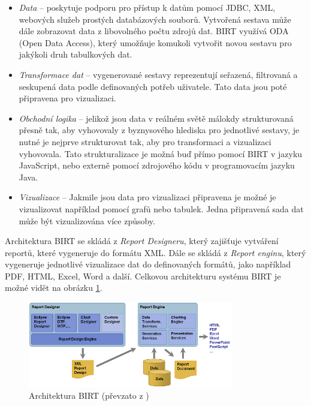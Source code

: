 \documentclass[czech,master]{diploma}
\begin{document}
\begin{itemize}
\item \textit{Data} -- poskytuje podporu pro přístup k datům pomocí JDBC, XML, webových služeb prostých databázových souborů. Vytvořená sestava může dále zobrazovat data z libovolného počtu zdrojů dat. BIRT využívá ODA (Open Data Access), který umožňuje komukoli vytvořit novou sestavu pro jakýkoli druh tabulkových dat.
\item \textit{Transformace dat} -- vygenerované sestavy reprezentují seřazená, filtrovaná a seskupená data podle definovaných potřeb uživatele. Tato data jsou poté připravena pro vizualizaci.
\item \textit{Obchodní logika} -- jelikož jsou data v reálném světě málokdy strukturovaná přesně tak, aby vyhovovaly z byznysového hlediska pro jednotlivé sestavy, je nutné je nejprve strukturovat tak, aby pro transformaci a vizualizaci vyhovovala. Tato strukturalizace je možná buď přímo pomocí BIRT v jazyku JavaScript, nebo externě pomocí zdrojového kódu v programovacím jazyku Java.

\item \textit{Vizualizace} -- Jakmile jsou data pro vizualizaci připravena je možné je vizualizovat například pomocí grafů nebo tabulek. Jedna připravená sada dat může být vizualizována více způsoby.
\end{itemize}

Architektura BIRT se skládá z \textit{Report Designeru}, který zajišťuje vytváření reportů, které vygeneruje do formátu XML. Dále se skládá z \textit{Report enginu}, který vygeneruje jednotlivé vizualizace dat do definovaných formátů, jako například PDF, HTML, Excel, Word a další. Celkovou architekturu systému BIRT je možné vidět na obrázku \ref{fig:birtarch}.

\begin{figure}[!ht]
    \centering
    \includegraphics[width=0.8\textwidth]{Diplomka/Figures/birtarch.png}
    \caption{Architektura BIRT (převzato z \cite{ref:birt_about})}
    \label{fig:birtarch}
\end{figure}
\end{document}
